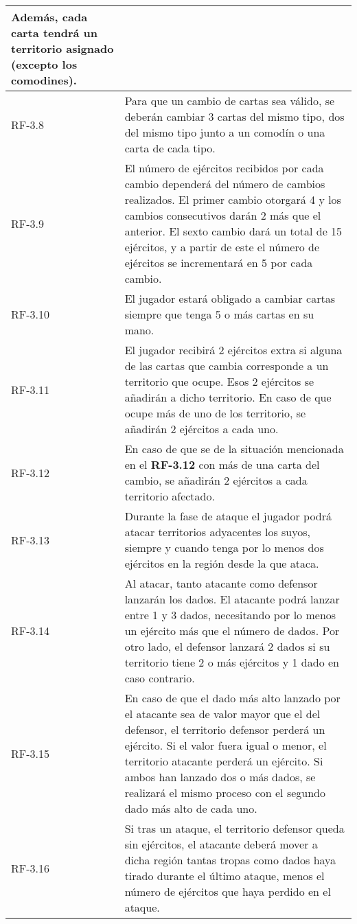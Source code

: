 \documentclass[11pt, a4paper, titlepage]{article}
\begin{document}
\begin{longtable}[h!]{| p{} | p{} |}
         Además, cada carta tendrá un territorio asignado (excepto los comodines).\\
         \hline
         RF-3.8 & Para que un cambio de cartas sea válido, se deberán cambiar 3 cartas del mismo tipo, dos del mismo tipo junto a un comodín o una carta de cada tipo. \\
         \hline
         RF-3.9 & El número de ejércitos recibidos por cada cambio dependerá del número de cambios realizados. El primer cambio otorgará 4 y los cambios consecutivos darán 2 más que el anterior. El sexto cambio dará un total de 15 ejércitos, y a partir de este el número de ejércitos se incrementará en 5 por cada cambio. \\
         \hline
         RF-3.10 & El jugador estará obligado a cambiar cartas siempre que tenga 5 o más cartas en su mano. \\
         \hline
         RF-3.11 & El jugador recibirá 2 ejércitos extra si alguna de las cartas que cambia corresponde a un territorio que ocupe. Esos 2 ejércitos se añadirán a dicho territorio. En caso de que ocupe más de uno de los territorio, se añadirán 2 ejércitos a cada uno.\\
         \hline
         RF-3.12 & En caso de que se de la situación mencionada en el \textbf{RF-3.12} con más de una carta del cambio, se añadirán 2 ejércitos a cada territorio afectado. \\
         \hline
         RF-3.13 & Durante la fase de ataque el jugador podrá atacar territorios adyacentes los suyos, siempre y cuando tenga por lo menos dos ejércitos en la región desde la que ataca.\\
         \hline
         RF-3.14 & Al atacar, tanto atacante como defensor lanzarán los dados. El atacante podrá lanzar entre 1 y 3 dados, necesitando por lo menos un ejército más que el número de dados. Por otro lado, el defensor lanzará 2 dados si su territorio tiene 2 o más ejércitos y 1 dado en caso contrario.\\
         \hline
         RF-3.15 & En caso de que el dado más alto lanzado por el atacante sea de valor mayor que el del defensor, el territorio defensor perderá un ejército. Si el valor fuera igual o menor, el territorio atacante perderá un ejército. Si ambos han lanzado dos o más dados, se realizará el mismo proceso con el segundo dado más alto de cada uno.\\
         \hline
         RF-3.16 & Si tras un ataque, el territorio defensor queda sin ejércitos, el atacante deberá mover a dicha región tantas tropas como dados haya tirado durante el último ataque, menos el número de ejércitos que haya perdido en el ataque. \\

\end{longtable}
\end{document}
